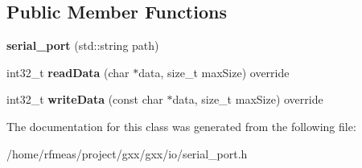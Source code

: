 \subsection*{Public Member Functions}
\begin{DoxyCompactItemize}
\item 
{\bfseries serial\+\_\+port} (std\+::string path)\hypertarget{classgxx_1_1io_1_1serial__port_acdb3140e1d74eb6faf3c0aece351a550}{}\label{classgxx_1_1io_1_1serial__port_acdb3140e1d74eb6faf3c0aece351a550}

\item 
int32\+\_\+t {\bfseries read\+Data} (char $\ast$data, size\+\_\+t max\+Size) override\hypertarget{classgxx_1_1io_1_1serial__port_a37aa778b1a4adc5b0e3cfe42782627c1}{}\label{classgxx_1_1io_1_1serial__port_a37aa778b1a4adc5b0e3cfe42782627c1}

\item 
int32\+\_\+t {\bfseries write\+Data} (const char $\ast$data, size\+\_\+t max\+Size) override\hypertarget{classgxx_1_1io_1_1serial__port_a95670bbfe7d97111dd236124fa6ad2c5}{}\label{classgxx_1_1io_1_1serial__port_a95670bbfe7d97111dd236124fa6ad2c5}

\end{DoxyCompactItemize}


The documentation for this class was generated from the following file\+:\begin{DoxyCompactItemize}
\item 
/home/rfmeas/project/gxx/gxx/io/serial\+\_\+port.\+h\end{DoxyCompactItemize}

